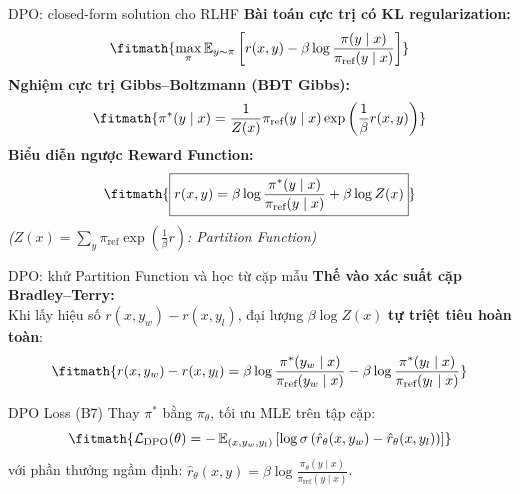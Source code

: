 \begin{frame}{DPO: closed-form solution cho RLHF}
      \small
      \textbf{Bài toán cực trị có KL regularization:}
      \[
        \fitmath{%
        \max_{\pi} \E_{y \sim \pi} \left[ r(x, y) - \beta \log \frac{\pi(y \mid x)}{\pi_{\text{ref}}(y \mid x)} \right]
        }
      \]
      \textbf{Nghiệm cực trị Gibbs--Boltzmann (BĐT Gibbs):}
      \[
        \fitmath{%
        \pi^*(y \mid x) = \frac{1}{Z(x)} \pi_{\text{ref}}(y \mid x) \exp\left(\frac{1}{\beta} r(x, y)\right)
        }
      \]
      \textbf{Biểu diễn ngược Reward Function:}
      \[
        \fitmath{%
        \boxed{r(x, y) = \beta \log \frac{\pi^*(y \mid x)}{\pi_{\text{ref}}(y \mid x)} + \beta \log Z(x)}
        }
      \]
      \textit{\footnotesize($Z(x) = \sum_{y} \pi_{\text{ref}}\exp(\frac{1}{\beta}r)$: Partition Function)}
  \par\vspace{0pt}
\end{frame}

\begin{frame}{DPO: khử Partition Function và học từ cặp mẫu}
      \small
      \textbf{Thế vào xác suất cặp Bradley--Terry:}\\
      Khi lấy hiệu số $r(x, y_w) - r(x, y_l)$, đại lượng $\beta \log Z(x)$ \textbf{tự triệt tiêu hoàn toàn}:
      \[
        \fitmath{%
        r(x, y_w) - r(x, y_l) = \beta \log \frac{\pi^*(y_w \mid x)}{\pi_{\text{ref}}(y_w \mid x)} - \beta \log \frac{\pi^*(y_l \mid x)}{\pi_{\text{ref}}(y_l \mid x)}
        }
      \]
      \vspace{-0.15cm}
      \begin{block}{DPO Loss (B7)}
        \footnotesize
        Thay $\pi^*$ bằng $\pi_\theta$, tối ưu MLE trên tập cặp:
        \[
          \fitmath{%
          \mathcal{L}_{\text{DPO}}(\theta) = -\E_{(x, y_w, y_l)} \left[ \log \sigma \left( \hat{r}_\theta(x, y_w) - \hat{r}_\theta(x, y_l) \right) \right]
          }
        \]
        với phần thưởng ngầm định:
        $\hat{r}_\theta(x, y) = \beta \log \frac{\pi_\theta(y \mid x)}{\pi_{\text{ref}}(y \mid x)}$.
      \end{block}
  \par\vspace{0pt}
\end{frame}

